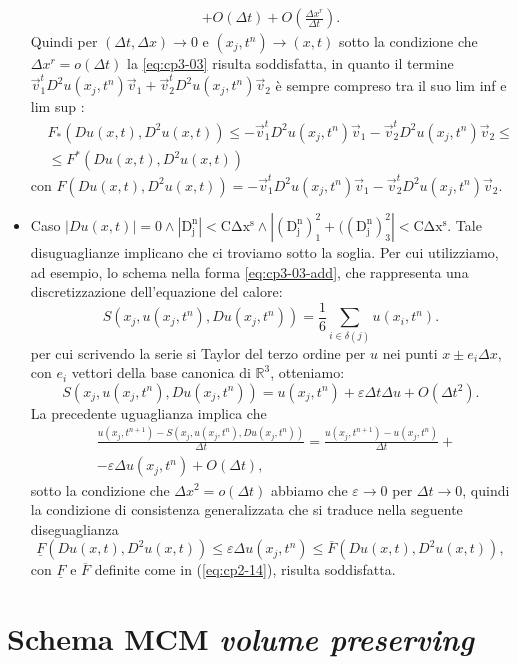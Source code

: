 \begin{itemize}
\[\begin{split}
   + O(\Delta t) + O(\frac{\Delta x^r}{\Delta t}).
\end{split}
\]
Quindi per  $(\Delta t,\Delta x)\to 0$ e $(x_j,t^n)\to(x,t)$ sotto la condizione che $\Delta x^r = o(\Delta t)$ la \eqref{eq:cp3-03} risulta soddisfatta, in quanto il termine $\vec{v}_1^tD^2u(x_j,t^n)\vec{v}_1 +\vec{v}_2^tD^2u(x_j,t^n)\vec{v}_2 $ è sempre compreso tra il suo lim inf e lim sup :
\[
\begin{split}
  &F_*(Du(x,t),D^2u(x,t))\le-\vec{v}_1^tD^2u(x_j,t^n)\vec{v}_1
  -\vec{v}_2^tD^2u(x_j,t^n)\vec{v}_2\le \\
  &\le F^*(Du(x,t),D^2u(x,t))
\end{split}
\]
con $F(Du(x,t),D^2u(x,t))=-\vec{v}_1^tD^2u(x_j,t^n)\vec{v}_1 -\vec{v}_2^tD^2u(x_j,t^n)\vec{v}_2$.
  \item \textsf{Caso} $|Du(x,t)|=0\land\mathrm{|D_j^n|< C\Delta x^s\land |(D_j^n)_1^2+((D_j^n)_3^2|< C\Delta x^s}$. Tale disuguaglianze implicano che ci troviamo sotto la soglia. Per cui utilizziamo, ad esempio, lo schema nella forma \eqref{eq:cp3-03-add}, che rappresenta una discretizzazione dell'equazione del calore:
\[
S(x_j,u(x_j,t^n),Du(x_j,t^n))=\frac{1}{6}\sum_{i\in\delta(j)}u(x_i,t^n).
\]
per cui scrivendo la serie si Taylor del terzo ordine per $u$ nei punti $x\pm e_i\Delta x$, con $e_i$ vettori della base canonica di $\mathbb{R}^3$, otteniamo:
\[
S(x_j,u(x_j,t^n),Du(x_j,t^n))=u(x_j,t^n) + \varepsilon\Delta t\Delta u + O(\Delta t^2).
\]
La precedente uguaglianza implica che
\[
\begin{split}
  &\frac{u(x_j,t^{n+1})-S(x_j,u(x_j,t^n),Du(x_j,t^n))}{\Delta t}= \frac{u(x_j,t^{n+1})-u(x_j,t^n)}{\Delta t} + \\
  &  -\varepsilon\Delta u(x_j,t^n) + O(\Delta t),
\end{split}
\]
sotto la condizione che $\Delta x^2=o(\Delta t)$ abbiamo che $\varepsilon\to 0$ per $\Delta t\to 0$, quindi la condizione di consistenza generalizzata che si traduce nella seguente diseguaglianza
\[
\underline{F}(Du(x,t),D^2u(x,t))\le\varepsilon\Delta u(x_j,t^n)\le \overline{F}(Du(x,t),D^2u(x,t)),
\]
con $\underline{F}$ e $\overline{F}$ definite come in (\hyperref[eq:cp2-14]{\ref{eq:cp2-14}}), risulta soddisfatta.  
\end{itemize}
%
\section{Schema MCM \emph{volume preserving}}
\label{sec:cp3-sc3-3}

